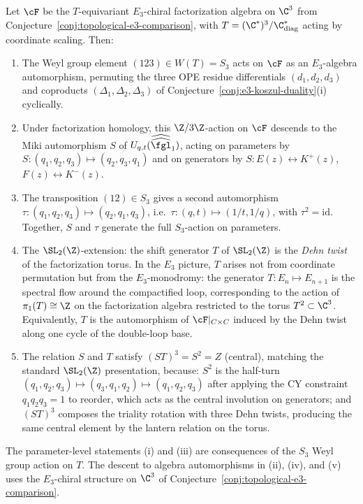 \begin{conjecture}
\label{conj:miki-from-e3}
\ClaimStatusConjectured
Let $\cF$ be the $T$-equivariant $E_3$-chiral factorization algebra on $\C^3$ from Conjecture~\ref{conj:topological-e3-comparison}, with $T = (\C^*)^3/\C^*_{\mathrm{diag}}$ acting by coordinate scaling. Then:
\begin{enumerate}[label=\textup{(\roman*)}]
 \item The Weyl group element $(123) \in W(T) = S_3$ acts on $\cF$ as an $E_3$-algebra automorphism, permuting the three OPE residue differentials $(d_1, d_2, d_3)$ and coproducts $(\Delta_1, \Delta_2, \Delta_3)$ of Conjecture~\ref{conj:e3-koszul-duality}(i) cyclically.
 \item Under factorization homology, this $\Z/3\Z$-action on $\cF$ descends to the Miki automorphism $S$ of $U_{q,t}(\widehat{\widehat{\fgl}}_1)$, acting on parameters by $S \colon (q_1,q_2,q_3) \mapsto (q_2,q_3,q_1)$ and on generators by $S \colon E(z) \leftrightarrow K^+(z)$, $F(z) \leftrightarrow K^-(z)$.
 \item The transposition $(12) \in S_3$ gives a second automorphism $\tau \colon (q_1,q_2,q_3) \mapsto (q_2,q_1,q_3)$, i.e.\ $\tau \colon (q,t) \mapsto (1/t, 1/q)$, with $\tau^2 = \mathrm{id}$. Together, $S$ and $\tau$ generate the full $S_3$-action on parameters.
 \item The $\SL_2(\Z)$-extension: the shift generator $T$ of $\SL_2(\Z)$ is the \emph{Dehn twist} of the factorization torus. In the $E_3$ picture, $T$ arises not from coordinate permutation but from the $E_3$-monodromy: the generator $T \colon E_n \mapsto E_{n+1}$ is the spectral flow around the compactified loop, corresponding to the action of $\pi_1(T) \cong \Z$ on the factorization algebra restricted to the torus $T^2 \subset \C^3$. Equivalently, $T$ is the automorphism of $\cF|_{C \times C}$ induced by the Dehn twist along one cycle of the double-loop base.
 \item The relation $S$ and $T$ satisfy $(ST)^3 = S^2 = Z$ (central), matching the standard $\SL_2(\Z)$ presentation, because: $S^2$ is the half-turn $(q_1,q_2,q_3) \mapsto (q_3,q_1,q_2) \mapsto (q_1,q_2,q_3)$ after applying the CY constraint $q_1 q_2 q_3 = 1$ to reorder, which acts as the central involution on generators; and $(ST)^3$ composes the triality rotation with three Dehn twists, producing the same central element by the lantern relation on the torus.
\end{enumerate}
The parameter-level statements \textup{(i)} and \textup{(iii)} are
consequences of the $S_3$ Weyl group action on $T$. The descent to
algebra automorphisms in \textup{(ii)}, \textup{(iv)}, and \textup{(v)}
uses the $E_3$-chiral structure on $\C^3$ of
Conjecture~\ref{conj:topological-e3-comparison}.
\end{conjecture}

